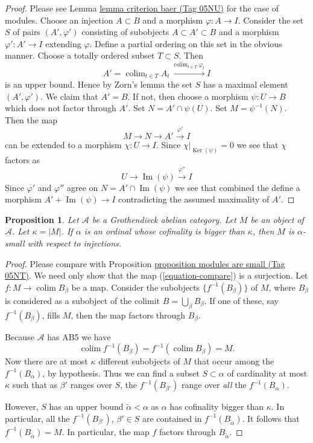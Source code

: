 \documentclass{amsart}
\theoremstyle{plain}
\newtheorem{proposition}[subsection]{Proposition}
\theoremstyle{definition}
\theoremstyle{remark}
\numberwithin{equation}{subsection}
\def\colim{\mathop{\mathrm{colim}}\nolimits}
\def\Ker{\mathop{\mathrm{Ker}}}
\def\Im{\mathop{\mathrm{Im}}}
\begin{document}
\begin{proof}
Please see Lemma \href{https://stacks.math.columbia.edu/tag/05NU}{lemma criterion baer (Tag 05NU)} for the case of modules.
Choose an injection $A \subset B$ and a morphism $\varphi : A \to I$.
Consider the set $S$ of pairs $(A', \varphi')$ consisting of
subobjects $A \subset A' \subset B$ and a morphism $\varphi' : A' \to I$
extending $\varphi$. Define a partial ordering on this set in the obvious
manner. Choose a totally ordered subset $T \subset S$. Then
$$
A' = \colim_{t \in T} A_t \xrightarrow{\colim_{t \in T} \varphi_t} I
$$
is an upper bound. Hence by Zorn's lemma the set $S$ has a maximal element
$(A', \varphi')$. We claim that $A' = B$. If not, then choose a morphism
$\psi : U \to B$ which does not factor through $A'$. Set
$N = A' \cap \psi(U)$. Set $M = \psi^{-1}(N)$. Then the map
$$
M \to N \to A' \xrightarrow{\varphi'} I
$$
can be extended to a morphism $\chi : U \to I$. Since
$\chi|_{\Ker(\psi)} = 0$ we see that $\chi$ factors as
$$
U \to \Im(\psi) \xrightarrow{\varphi''} I
$$
Since $\varphi'$ and $\varphi''$ agree on $N = A' \cap \Im(\psi)$
we see that combined the define a morphism $A' + \Im(\psi) \to I$
contradicting the assumed maximality of $A'$.
\end{proof}


\begin{proposition}
\label{proposition-objects-are-small}
Let $\mathcal{A}$ be a Grothendieck abelian category. Let $M$ be an
object of $\mathcal{A}$. Let $\kappa = |M|$.
If $\alpha$ is an ordinal whose cofinality is bigger than $\kappa$,
then $M$ is $\alpha$-small with respect to injections.
\end{proposition}

\begin{proof}
Please compare with Proposition \href{https://stacks.math.columbia.edu/tag/05NT}{proposition modules are small (Tag 05NT)}.
We need only show that the map (\ref{equation-compare}) is a surjection.
Let $f : M \to \colim B_\beta$ be a map.
Consider the subobjects $\{f^{-1}(B_\beta)\}$ of $M$, where $B_\beta$
is considered as a subobject of the colimit $B = \bigcup_\beta B_\beta$.
If one of these, say $f^{-1}(B_\beta)$, fills $M$,
then the map factors through $B_\beta$.

\medskip\noindent
Because $\mathcal{A}$ has AB5 we have
$$
\colim f^{-1}(B_\beta) = f^{-1}\left(\colim B_\beta\right) = M.
$$
Now there are at most $\kappa$ different subobjects of $M$ that occur among
the $f^{-1}(B_\alpha)$, by hypothesis.
Thus we can find a subset $S \subset \alpha$ of cardinality at most
$\kappa$ such that as $\beta'$ ranges over $S$, the
$f^{-1}(B_{\beta'})$ range over \emph{all} the $f^{-1}(B_\alpha)$.

\medskip\noindent
However, $S$ has an upper bound $\widetilde{\alpha} < \alpha$ as
$\alpha$ has cofinality bigger than $\kappa$. In particular, all the
$f^{-1}(B_{\beta'})$, $\beta' \in S$ are contained in
$f^{-1}(B_{\widetilde{\alpha}})$.
It follows that $f^{-1}(B_{\widetilde{\alpha}}) = M$.
In particular, the map $f$ factors through $B_{\widetilde{\alpha}}$.
\end{proof}
\end{document}
